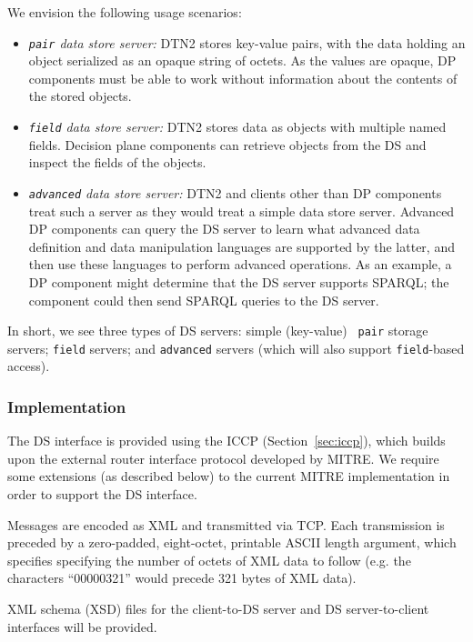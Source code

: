 We envision the following usage scenarios:

\begin{itemize}
\item {\em {\tt pair} data store server:} DTN2 stores key-value pairs,
with the data holding an object serialized as an opaque string of octets.
As the values are opaque, DP components must be able
to work without information about the contents of the stored objects.
\item {\em {\tt field} data store server:} DTN2 stores data as objects
with multiple named fields. Decision plane components can retrieve objects from the
DS and inspect the fields of the objects. 
\item {\em {\tt advanced} data store server:} DTN2 and clients other
than DP components treat such a server as they would treat
a simple data store server. Advanced DP components can query
the DS server to learn what advanced data definition and data
manipulation languages are supported by the latter, and
then use these languages to perform advanced operations. As an
example, a DP component might determine that the DS 
server supports SPARQL; the component could then
send SPARQL queries to the DS server.
\end{itemize}

In short, we see three types of DS servers: simple (key-value) {\tt
pair} storage servers; {\tt field} servers; and {\tt advanced} servers
(which will also support {\tt field}-based access).

\subsubsection{Implementation}\label{sec:ds-iccp-impl}

The DS interface is provided using the ICCP (Section~\ref{sec:iccp}), which 
builds upon the external router interface protocol developed by MITRE. We 
require some extensions (as described below) to the current MITRE 
implementation in order to  support the DS interface.

Messages are encoded as XML and transmitted via TCP.  Each
transmission is preceded by a zero-padded, eight-octet, printable
ASCII length argument, which specifies specifying the number of octets of
XML data to follow (e.g. the characters ``00000321'' would precede 321
bytes of XML data).

XML schema (XSD) files for the client-to-DS server and DS
server-to-client interfaces will be provided.

